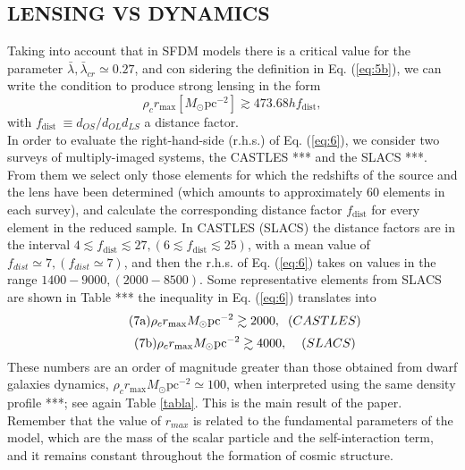 \documentclass[10pt, letterpaper]{article}
\begin{document}
\begin{multicols}{2}
		\section{\centering\small\selectfont LENSING VS DYNAMICS}
		Taking into account that in SFDM models there is a critical value for the parameter  $\bar{\lambda},\bar{\lambda}_{cr}\simeq0.27$, and con sidering the definition in Eq. (\ref{eq:5b}), we can write the condition to produce strong lensing in the form
		\begin{equation}\tag{6}\label{eq:6}
			\rho_{c} r_{\max }\left[M_{\odot} \mathrm{pc}^{-2}\right] \gtrsim 473.68 h f_{\text {dist}},
		\end{equation}
		with $f_{\text {dist }}\equiv d_{OS}/d_{OL} d_{LS}$ a distance factor.\\
		In order to evaluate the right-hand-side (r.h.s.) of Eq. (\ref{eq:6}), we consider two surveys of multiply-imaged systems, the CASTLES *** and the SLACS ***. From them we select only those elements for which the redshifts of the source and the lens have been determined (which amounts to approximately 60 elements in each survey), and calculate the corresponding distance factor $f_{\text {dist}}$ for every element in the reduced sample. In CASTLES (SLACS) the distance factors are in the interval $4 \lesssim f_{\text {dist}} \lesssim 27, (6 \lesssim f_{\text {dist}} \lesssim 25)$, with a mean value of $f_{dist} \simeq 7, (f_{dist} \simeq 7)$, and then the r.h.s. of Eq. (\ref{eq:6}) takes on values in the range $1400 - 9000, (2000 - 8500)$.
		Some representative elements from SLACS are shown in Table *** the inequality in Eq. (\ref{eq:6}) translates into
		\begin{equation}\tag{7a}\label{eq:7a}
			\rho_{c} r_{\max } M_{\odot} \mathrm{pc}^{-2} \gtrsim 2000, \hspace{0.2cm} (CASTLES)
		\end{equation}
		\begin{equation}\tag{7b}\label{eq:7b}
			\rho_{c} r_{\max } M_{\odot} \mathrm{pc}^{-2} \gtrsim 4000, \hspace{0.4cm} (SLACS)
		\end{equation}
		These numbers are an order of magnitude greater than those obtained from dwarf galaxies dynamics, $\rho_c r_{\max}M_{\odot} \mathrm{pc}^{-2} \simeq 100$, when interpreted using the same density profile ***; see again Table \ref{tabla}. This is the main result of the paper. Remember that the value of $r_{max}$ is related to the fundamental parameters of the model, which are the mass of the scalar particle and the self-interaction term, and it remains constant throughout the formation of cosmic structure.\\

\end{multicols}
\end{document}
